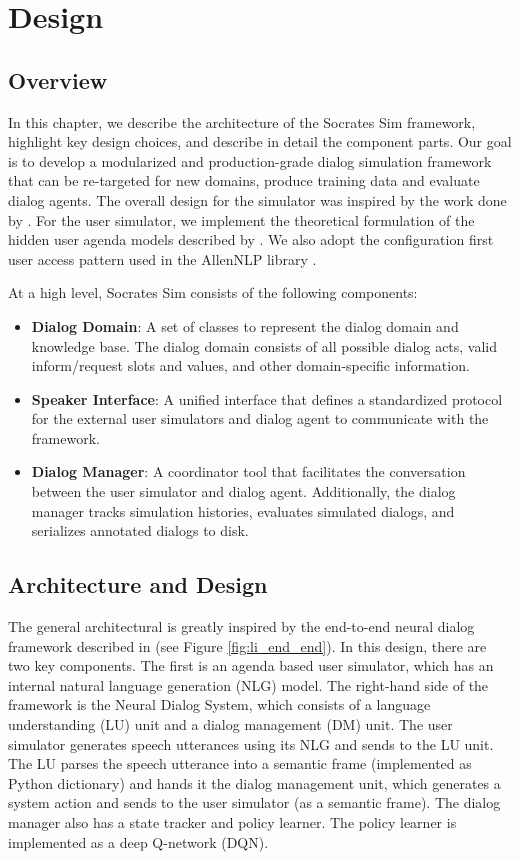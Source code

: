 \chapter{Design}
\label{chap:design}

\section{Overview}
\label{sec:designintroduction}

In this chapter, we describe the architecture of the Socrates Sim framework, highlight key design choices, and describe in detail the component parts. Our goal is to develop a modularized and production-grade dialog simulation framework that can be re-targeted for new domains, produce training data and evaluate dialog agents. The overall design for the simulator was inspired by the work done by \cite{li_usersim}. For the user simulator, we implement the theoretical formulation of the hidden user agenda models described by \citet{Schatzmann2009TheHA}. We also adopt the configuration first user access pattern used in the AllenNLP library \citep{Gardner_allennlp}.

At a high level, Socrates Sim consists of the following components:
\begin{itemize}
	\item \textbf{Dialog Domain}: A set of classes to represent the dialog domain and knowledge base. The dialog domain consists of all possible dialog acts, valid inform/request slots and values, and other domain-specific information. 
	\item \textbf{Speaker Interface}: A unified interface that defines a standardized protocol for the external user simulators and dialog agent to communicate with the framework. 
	\item \textbf{Dialog Manager}: A coordinator tool that facilitates the conversation between the user simulator and dialog agent. Additionally, the dialog manager tracks simulation histories, evaluates simulated dialogs, and serializes annotated dialogs to disk.  
\end{itemize}


\section{Architecture and Design} 

The general architectural is greatly inspired by the end-to-end neural dialog framework described in \cite{li_end_to_end}  (see Figure \ref{fig:li_end_end}). In this design, there are two key components. The first is an agenda based user simulator, which has an internal natural language generation (NLG) model. The right-hand side of the framework is the Neural Dialog System, which consists of a language understanding (LU) unit and a dialog management (DM) unit. The user simulator generates speech utterances using its NLG and sends to the LU unit. The LU parses the speech utterance into a semantic frame (implemented as Python dictionary) and hands it the dialog management unit, which generates a system action and sends to the user simulator (as a semantic frame). The dialog manager also has a state tracker and policy learner. The policy learner is implemented as a deep Q-network (DQN). 

